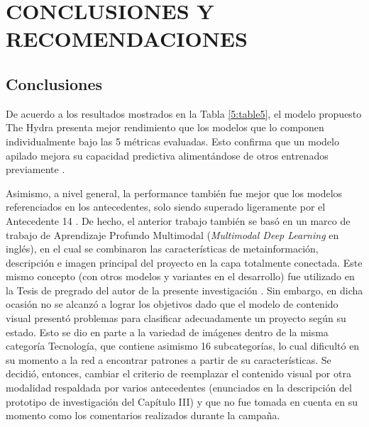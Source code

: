 \chapter{CONCLUSIONES Y RECOMENDACIONES}
\section{Conclusiones}
De acuerdo a los resultados mostrados en la Tabla \ref{5:table5}, el modelo propuesto The Hydra presenta mejor rendimiento que los modelos que lo componen individualmente bajo las 5 métricas evaluadas. Esto confirma que un modelo apilado mejora su capacidad predictiva alimentándose de otros entrenados previamente \parencite{tec_brownlee2018stacked_models}.

Asimismo, a nivel general, la performance también fue mejor que los modelos referenciados en los antecedentes, solo siendo superado ligeramente por el Antecedente 14 \parencite{pr_cheng2019deeplearning}. De hecho, el anterior trabajo también se basó en un marco de trabajo de Aprendizaje Profundo Multimodal (\textit{Multimodal Deep Learning} en inglés), en el cual se combinaron las características de metainformación, descripción e imagen principal del proyecto en la capa totalmente conectada. Este mismo concepto (con otros modelos y variantes en el desarrollo) fue utilizado en la Tesis de pregrado del autor de la presente investigación \parencite{pr_puente2019kickstarter_prediction}. Sin embargo, en dicha ocasión no se alcanzó a lograr los objetivos dado que el modelo de contenido visual presentó problemas para clasificar adecuadamente un proyecto según su estado. Esto se dio en parte a la variedad de imágenes dentro de la misma categoría Tecnología, que contiene asimismo 16 subcategorías, lo cual dificultó en su momento a la red a encontrar patrones a partir de su características. Se decidió, entonces, cambiar el criterio de reemplazar el contenido visual por otra modalidad respaldada por varios antecedentes (enunciados en la descripción del prototipo de investigación del Capítulo III) y que no fue tomada en cuenta en su momento como los comentarios realizados durante la campaña.

